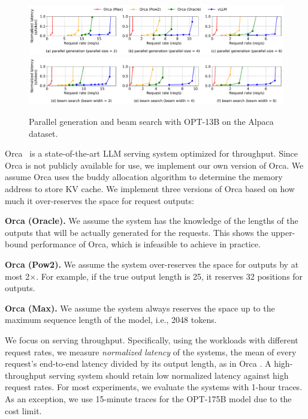 \begin{figure}[t]
    \centering
    \includegraphics[scale=0.46]{figures/experiments/parallel.pdf}
    \includegraphics[scale=0.46]{figures/experiments/beam.pdf}
\caption{Parallel generation and beam search with OPT-13B on the Alpaca dataset.}
\label{fig:parallel-beam-alpaca}
\vspace{-5pt}
\end{figure}


Orca~\cite{yu2022orca} is a state-of-the-art LLM serving system optimized for throughput.
Since Orca is not publicly available for use, we implement our own version of Orca.
We assume Orca uses the buddy allocation algorithm to determine the memory address to store KV cache.
We implement three versions of Orca based on how much it over-reserves the space for request outputs:
\begin{CompactItemize}
    \item \textbf{Orca (Oracle).} We assume the system has the knowledge of the lengths of the outputs that will be actually generated for the requests. This shows the upper-bound performance of Orca, which is infeasible to achieve in practice.
    \item \textbf{Orca (Pow2).} We assume the system over-reserves the space for outputs by at most 2$\times$. For example, if the true output length is 25, it reserves 32 positions for outputs.
    \item \textbf{Orca (Max).} We assume the system always reserves the space up to the maximum sequence length of the model, i.e., 2048 tokens.
\end{CompactItemize}

We focus on serving throughput.
Specifically, using the workloads with different request rates, we measure \textit{normalized latency} of the systems, the mean of every request's end-to-end latency divided by its output length, as in Orca \cite{yu2022orca}.
A high-throughput serving system should retain low normalized latency against high request rates.
For most experiments, we evaluate the systems with 1-hour traces.
As an exception, we use 15-minute traces for the OPT-175B model due to the cost limit.


